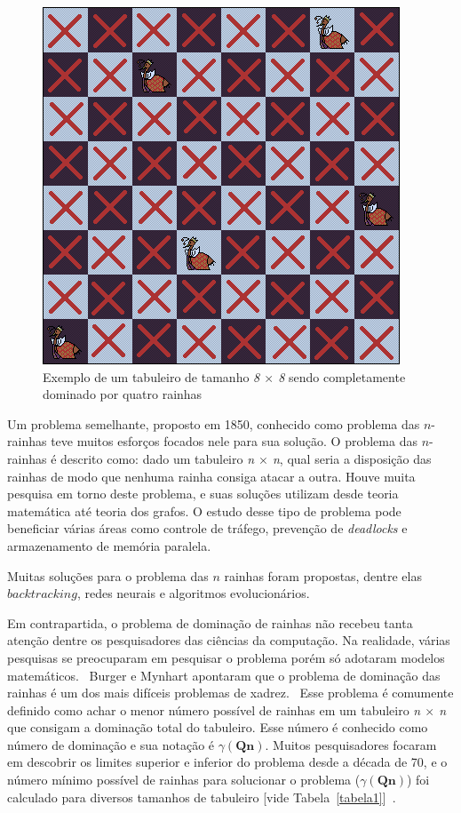 \documentclass[
	article,			%
	11pt,				%
	oneside,			%
	a4paper,			%
	english,			%
	brazil,				%
	sumario=tradicional
	]{abntex2}
\begin{document}
\begin{figure}
  \centering
  \includegraphics[width=0.60\linewidth]{dom2rainha8x8.png}
  \caption{Exemplo de um tabuleiro de tamanho \textit{8 $\times$ 8} sendo completamente dominado por
  quatro rainhas}
  \label{fig:2rainha}
\end{figure}

Um problema semelhante, proposto em 1850, conhecido como problema das $n$-rainhas teve muitos esforços focados nele para sua solução. O problema das $n$-rainhas é descrito como: dado um tabuleiro \textit{n $\times$ n}, qual seria a disposição das rainhas de modo que nenhuma rainha consiga atacar a outra. Houve muita pesquisa em torno deste problema, e suas soluções utilizam desde teoria matemática até teoria dos grafos. O estudo desse tipo de problema pode beneficiar várias áreas como controle de tráfego, prevenção de \textit{deadlocks} e armazenamento de memória paralela.~\cite{bell2009survey}

Muitas soluções para o problema das $n$ rainhas foram propostas, dentre elas $backtracking$, redes neurais e algoritmos evolucionários.

Em contrapartida, o problema de dominação de rainhas não recebeu tanta atenção dentre os pesquisadores das ciências da computação. Na realidade, várias pesquisas se preocuparam em pesquisar o problema porém só adotaram modelos matemáticos.~\cite{alharbi2017genetic} Burger e Mynhart apontaram que o problema de dominação das rainhas é um dos mais difíceis problemas de xadrez.~\cite{art43}
Esse problema é comumente definido como achar o menor número possível de rainhas em um tabuleiro \textit{n $\times$ n} que consigam a dominação total do tabuleiro. Esse número é conhecido como número de dominação e sua notação é $\gamma(\textbf{Qn})$.
Muitos pesquisadores focaram em descobrir os limites superior e inferior do problema desde a década de 70,  e o número mínimo possível de rainhas para solucionar o problema ($\gamma(\textbf{Qn})$) foi calculado para diversos tamanhos de tabuleiro [vide Tabela~\ref{tabela1}]~\cite{art3,art43,art44,art45}.
\end{document}
